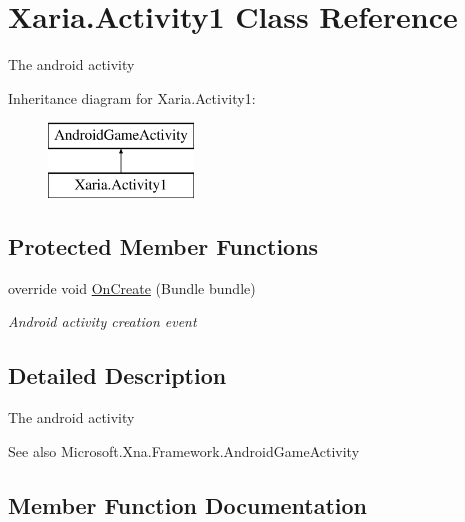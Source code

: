 \hypertarget{classXaria_1_1Activity1}{}\section{Xaria.\+Activity1 Class Reference}
\label{classXaria_1_1Activity1}


The android activity  


Inheritance diagram for Xaria.\+Activity1\+:\begin{figure}[H]
\begin{center}
\leavevmode
\includegraphics[height=2.000000cm]{classXaria_1_1Activity1}
\end{center}
\end{figure}
\subsection*{Protected Member Functions}
\begin{DoxyCompactItemize}
\item 
override void \hyperlink{classXaria_1_1Activity1_a1b2c637e080b9032389a43705d193581}{On\+Create} (Bundle bundle)
\begin{DoxyCompactList}\small\item\em Android activity creation event \end{DoxyCompactList}\end{DoxyCompactItemize}


\subsection{Detailed Description}
The android activity 

\begin{DoxySeeAlso}{See also}
Microsoft.\+Xna.\+Framework.\+Android\+Game\+Activity


\end{DoxySeeAlso}


\subsection{Member Function Documentation}
\mbox{\label{classXaria_1_1Activity1_a1b2c637e080b9032389a43705d193581}} 
